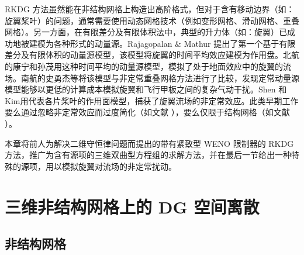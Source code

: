RKDG 方法虽然能在非结构网格上构造出高阶格式，但对于含有移动边界（如：旋翼桨叶）的问题，通常需要使用动态网格技术（例如变形网格、滑动网格、重叠网格）。另一方面，在有限差分及有限体积法中，典型的升力体（如：旋翼）已成功地被建模为各种形式的动量源。Rajagopalan
\& Mathur  提出了第一个基于有限差分及有限体积的动量源模型，该模型将旋翼的时间平均效应建模为作用盘。北航的康宁和孙茂用这种时间平均的动量源模型，模拟了处于地面效应中的旋翼的流场。南航的史勇杰等将该模型与非定常重叠网格方法进行了比较，发现定常动量源模型能够以更低的计算成本模拟旋翼和飞行甲板之间的复杂气动干扰。Shen
和 Kim用代表各片桨叶的作用面模型，捕获了旋翼流场的非定常效应。此类早期工作要么通过忽略非定常效应而过度简化（如文献 \cite{Rajagopalan_1989,Rajagopalan_1993,Kang_1997,Kang_2000}），要么仅限于结构网格（如文献 \cite{Shen_2009,Shi_2017}）。

本章将前人为解决二维守恒律问题而提出的带有紧致型 WENO 限制器的 RKDG 方法，推广为含有源项的三维双曲型方程组的求解方法，并在最后一节给出一种特殊的源项，用以模拟旋翼对流场的非定常扰动。

\section{三维非结构网格上的 DG 空间离散\label{sec:DG}}

\subsection{非结构网格}

